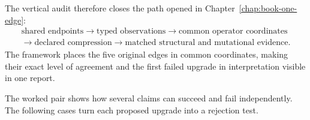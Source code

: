 The vertical audit therefore closes the path opened in
Chapter~\ref{chap:book-one-edge}:
\begin{equation}
\boxed{
\begin{gathered}
\text{shared endpoints}
\longrightarrow
\text{typed observations}
\longrightarrow
\text{common operator coordinates}\\
\longrightarrow
\text{declared compression}
\longrightarrow
\text{matched structural and mutational evidence}.
\end{gathered}}
\label{eq:vertical-audit-path}
\end{equation}
The framework places the five original edges in common coordinates, making their exact level of
agreement and the first failed upgrade in interpretation visible in one report.

The worked pair shows how several claims can succeed and fail independently.  The following cases
turn each proposed upgrade into a rejection test.
